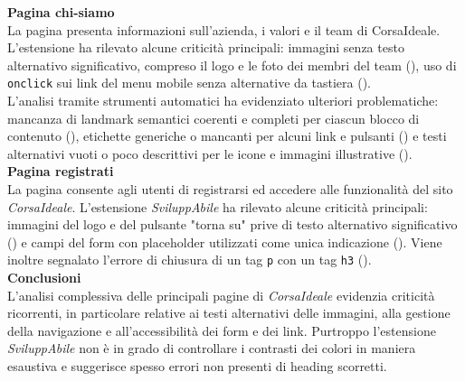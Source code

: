 \noindent \textbf{Pagina chi-siamo}\\
La pagina presenta informazioni sull’azienda, i valori e il team di CorsaIdeale. 
L’estensione ha rilevato alcune criticità principali: immagini senza testo alternativo significativo, compreso il logo e le foto dei membri del team ({}), uso di \texttt{onclick} sui link del menu mobile senza alternative da tastiera ({}).\\
L’analisi tramite strumenti automatici ha evidenziato ulteriori problematiche: mancanza di landmark semantici coerenti e completi per ciascun blocco di contenuto ({}), etichette generiche o mancanti per alcuni link e pulsanti ({}) e testi alternativi vuoti o poco descrittivi per le icone e immagini illustrative ({}).\\

\noindent \textbf{Pagina registrati}\\
La pagina consente agli utenti di registrarsi ed accedere alle funzionalità del sito \textit{CorsaIdeale}. 
L’estensione \textit{SviluppAbile} ha rilevato alcune criticità principali: immagini del logo e del pulsante "torna su" prive di testo alternativo significativo ({}) e campi del form con placeholder utilizzati come unica indicazione ({}). Viene inoltre segnalato l'errore di chiusura di un tag \texttt{p} con un tag \texttt{h3} ({}).\\

\noindent \textbf{Conclusioni}\\
L’analisi complessiva delle principali pagine di \textit{CorsaIdeale} evidenzia criticità ricorrenti, in particolare relative ai testi alternativi delle immagini, alla gestione della navigazione e all’accessibilità dei form e dei link. Purtroppo l'estensione \textit{SviluppAbile} non è in grado di controllare i contrasti dei colori in maniera esaustiva e suggerisce spesso errori non presenti di heading scorretti.

